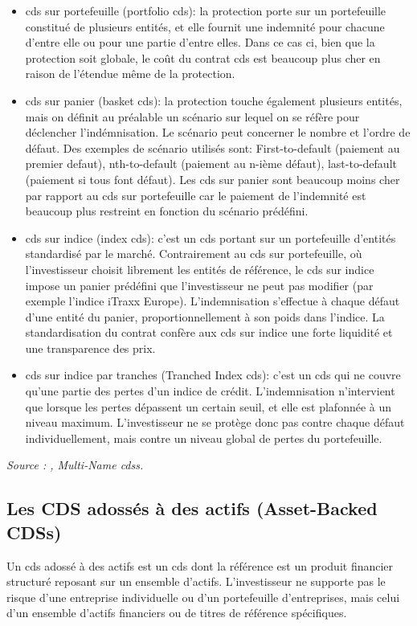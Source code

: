 \begin{itemize}
    \item \gls{cds} sur portefeuille (portfolio \gls{cds}): la protection porte sur un portefeuille constitué de plusieurs entités, et elle fournit une indemnité pour chacune d'entre elle ou pour une partie d'entre elles. Dans ce cas ci, bien que la protection soit globale, le coût du contrat \gls{cds} est beaucoup plus cher en raison de l'étendue même de la protection.
    \item \gls{cds} sur panier (basket \gls{cds}): la protection touche également plusieurs entités, mais on définit au préalable un scénario sur lequel on se réfère pour déclencher l'indémnisation. Le scénario peut concerner le nombre et l'ordre de défaut. Des exemples de scénario utilisés sont: First-to-default (paiement au premier defaut), nth-to-default (paiement au n-ième défaut), last-to-default (paiement si tous font défaut). Les \gls{cds} sur panier sont beaucoup moins cher par rapport au \gls{cds} sur portefeuille car le paiement de l'indemnité est beaucoup plus restreint en fonction du scénario prédéfini.
    \item \gls{cds} sur indice (index \gls{cds}): c'est un \gls{cds} portant sur un portefeuille d’entités standardisé par le marché. Contrairement au \gls{cds} sur portefeuille, où l’investisseur choisit librement les entités de référence, le \gls{cds} sur indice impose un panier prédéfini que l’investisseur ne peut pas modifier (par exemple l’indice iTraxx Europe). L’indemnisation s’effectue à chaque défaut d’une entité du panier, proportionnellement à son poids dans l’indice. La standardisation du contrat confère aux \gls{cds} sur indice une forte liquidité et une transparence des prix.
    \item \gls{cds} sur indice par tranches (Tranched Index \gls{cds}): c'est un \gls{cds} qui ne couvre qu’une partie des pertes d’un indice de crédit. L’indemnisation n’intervient que lorsque les pertes dépassent un certain seuil, et elle est plafonnée à un niveau maximum. L’investisseur ne se protège donc pas contre chaque défaut individuellement, mais contre un niveau global de pertes du portefeuille.
\end{itemize}

\noindent\textit{Source : \cite{credit_default_swap}, Multi-Name \gls{cds}s.}

\subsection{Les CDS adossés à des actifs (Asset-Backed CDSs)}
Un \gls{cds} adossé à des actifs est un \gls{cds} dont la référence est un produit financier structuré reposant sur un ensemble d’actifs. L’investisseur ne supporte pas le risque d’une entreprise individuelle ou d'un portefeuille d'entreprises, mais celui d’un ensemble d’actifs financiers ou de titres de référence spécifiques.

